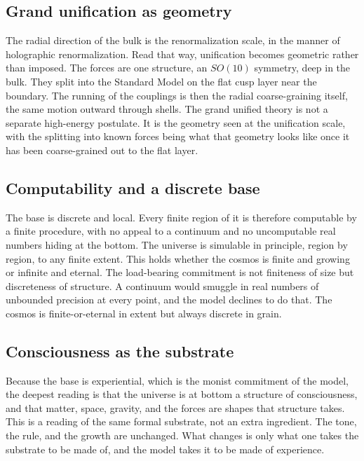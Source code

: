 \subsection{Grand unification as geometry}

The radial direction of the bulk is the renormalization scale, in the manner of holographic renormalization. Read that way, unification becomes geometric rather than imposed. The forces are one structure, an $SO(10)$ symmetry, deep in the bulk. They split into the Standard Model on the flat cusp layer near the boundary. The running of the couplings is then the radial coarse-graining itself, the same motion outward through shells. The grand unified theory is not a separate high-energy postulate. It is the geometry seen at the unification scale, with the splitting into known forces being what that geometry looks like once it has been coarse-grained out to the flat layer.

\subsection{Computability and a discrete base}

The base is discrete and local. Every finite region of it is therefore computable by a finite procedure, with no appeal to a continuum and no uncomputable real numbers hiding at the bottom. The universe is simulable in principle, region by region, to any finite extent. This holds whether the cosmos is finite and growing or infinite and eternal. The load-bearing commitment is not finiteness of size but discreteness of structure. A continuum would smuggle in real numbers of unbounded precision at every point, and the model declines to do that. The cosmos is finite-or-eternal in extent but always discrete in grain.

\subsection{Consciousness as the substrate}

Because the base is experiential, which is the monist commitment of the model, the deepest reading is that the universe is at bottom a structure of consciousness, and that matter, space, gravity, and the forces are shapes that structure takes. This is a reading of the same formal substrate, not an extra ingredient. The tone, the rule, and the growth are unchanged. What changes is only what one takes the substrate to be made of, and the model takes it to be made of experience.

